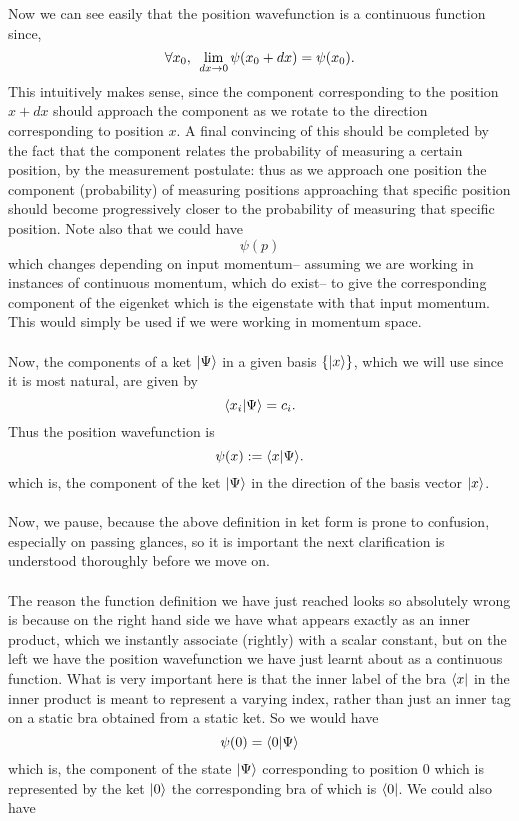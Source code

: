 \\\\
Now we can see easily that the position wavefunction is a continuous function since, 
$$
\forall x_{0}, \:\: \lim_{dx\to 0} \psi(x_{0}+dx)=\psi(x_{0}).
$$
This intuitively makes sense, since the component corresponding to the position $x+dx$ should approach the component as we rotate to the direction corresponding to position $x$. A final convincing of this should be completed by the fact that the component relates the probability of measuring a certain position, by the measurement postulate: thus as we approach one position the component (probability) of measuring positions approaching that specific position should become progressively closer to the probability of measuring that specific position. Note also that we could have 
$$
\psi(p)
$$
which changes depending on input momentum-- assuming we are working in instances of continuous momentum, which do exist-- to give the corresponding component of the eigenket which is the eigenstate with that input momentum. This would simply be used if we were working in momentum space.
\\\\
Now, the components of a ket $|\Psi\rangle$ in a given basis $\{|x\rangle\}$, which we will use since it is most natural, are given by 
$$
\langle x_{i}|\Psi\rangle=c_{i}.
$$
Thus the position wavefunction is
$$
\psi(x):=\langle x|\Psi\rangle.
$$
which is, the component of the ket $|\Psi\rangle$ in the direction of the basis vector $|x\rangle$.
\\\\
Now, we pause, because the above definition in ket form is prone to confusion, especially on passing glances, so it is important the next clarification is understood thoroughly before we move on.
\\\\
The reason the function definition we have just reached looks so absolutely wrong is because on the right hand side we have what appears exactly as an inner product, which we instantly associate (rightly) with a scalar constant, but on the left we have the position wavefunction we have just learnt about as a continuous function. What is very important here is that the inner label of the bra $\langle x|$ in the inner product is meant to represent a varying index, rather than just an inner tag on a static bra obtained from a static ket. So we would have
$$
\psi(0)=\langle0|\Psi\rangle
$$
which is, the component of the state $|\Psi\rangle$ corresponding to position $0$ which is represented by the ket $|0\rangle$ the corresponding bra of which is $\langle0|$. We could also have 
